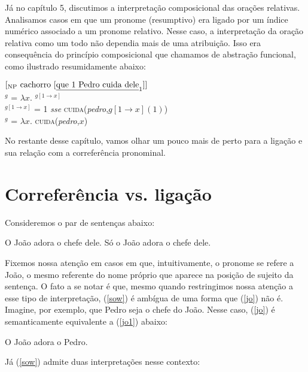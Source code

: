 Já no capítulo 5, discutimos a interpretação composicional das orações relativas. Analisamos casos em que um pronome (resumptivo) era ligado por um índice numérico associado a um pronome relativo. Nesse caso, a interpretação da oração relativa como um todo não dependia mais de uma atribuição. Isso era consequência do princípio composicional que chamamos de abstração funcional, como ilustrado resumidamente abaixo:

\begin{exe}
\ex $[_{\text{NP}}\ \text{cachorro}\ [\text{\underline{que 1 Pedro cuida dele}}_{1}]]$\\
$^{g}$ = $\lambda x.$ $^{g[1 \rightarrow x]}$\\
$^{g[1 \rightarrow x]}$ = 1 \textit{sse} \textsc{cuida}(\textit{pedro},$g[1 \rightarrow x](1)$)\\
$^{g}$ = $\lambda x.$ \textsc{cuida}(\textit{pedro},$x$)
\end{exe}

\n No restante desse capítulo, vamos olhar um pouco mais de perto para a ligação e sua relação com a correferência pronominal.  


\section{Correferência vs. ligação}

Consideremos o par de sentenças abaixo:

\begin{exe}
    \ex O João adora o chefe dele. \label{jo}
    \ex Só o João adora o chefe dele.  \label{sow}
\end{exe}

\n Fixemos nossa atenção em casos em que, intuitivamente, o pronome se refere a João, o mesmo referente do nome próprio que aparece na posição de sujeito da sentença. O fato a se notar é que, mesmo quando restringimos nossa atenção a esse tipo de interpretação, (\ref{sow}) é ambígua de uma forma que (\ref{jo}) não é. Imagine, por exemplo, que Pedro seja o chefe do João. Nesse caso, (\ref{jo}) é semanticamente equivalente a (\ref{jo1}) abaixo:
 
\begin{exe}
	\ex O João adora o Pedro. \label{jo1}
\end{exe}

\n Já (\ref{sow}) admite duas interpretações nesse contexto:

